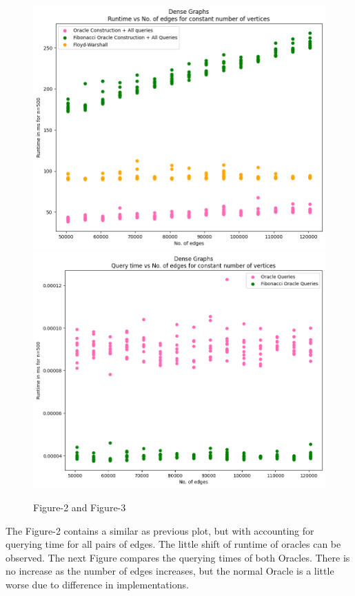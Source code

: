 \documentclass[12pt, a4paper]{article}
\begin{document}
    \begin{figure}[H]
    \caption*{Figure-2 and Figure-3}
    \includegraphics[scale=0.4]{./images/2}
    \includegraphics[scale=0.4]{./images/3}
    \end{figure} 
    The Figure-2 contains a similar as previous plot, but with accounting for querying time for all pairs of edges. The little shift of runtime of oracles can be observed.
    The next Figure compares the querying times of both Oracles. There is no increase as the number of edges increases, but the normal Oracle is a little worse due to difference in implementations.
\end{document}
